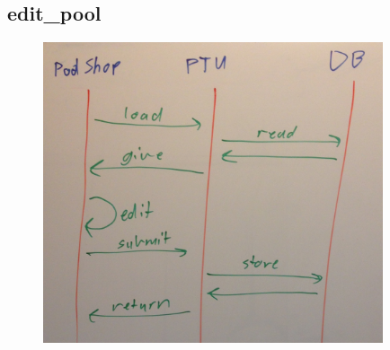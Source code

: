 \subsection{edit\_pool}
\begin{figure}[!ht]
\begin{center}
	\includegraphics[width=10cm]{images/edit_pool}
	\caption{}
\end{center}
\end{figure}
\FloatBarrier